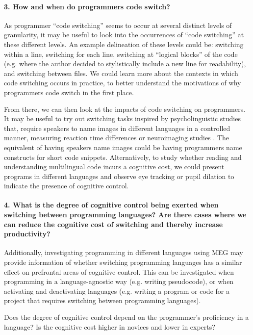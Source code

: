 \documentclass[a4paper,UKenglish,cleveref, autoref]{oasics-v2019}
\begin{document}
\paragraph*{3. How and when do programmers code switch?}

As programmer “code switching” seems to occur at several distinct levels of granularity, it may be useful to look into the occurrences of “code switching” at these different levels. An example delineation of these levels could be: switching within a line, switching for each line, switching at “logical blocks” of the code (e.g. where the author decided to stylistically include a new line for readability), and switching between files. We could learn more about the contexts in which code switching occurs in practice, to better understand the motivations of why programmers code switch in the first place. 

From there, we can then look at the impacts of code switching on programmers. It may be useful to try out switching tasks inspired by psycholinguistic studies that, require speakers to name images in different languages in a controlled manner, measuring reaction time differences or neuroimaging studies \cite{pl0048}. The equivalent of having speakers name images could be having programmers name constructs for short code snippets. Alternatively, to study whether reading and understanding multilingual code incurs a cognitive cost, we could present programs in different languages and observe eye tracking or pupil dilation to indicate the presence of cognitive control. 
\paragraph*{4. What is the degree of cognitive control being exerted when switching between programming languages? Are there cases where we can reduce the cognitive cost of switching and thereby increase productivity?}

Additionally, investigating programming in different languages using MEG may provide information of whether switching programming languages has a similar effect on prefrontal areas of cognitive control. This can be investigated when programming in a language-agnostic way (e.g. writing pseudocode), or when activating and deactivating languages (e.g. writing a program or code for a project that requires switching between programming languages). 

Does the degree of cognitive control depend on the programmer's proficiency in a language? Is the cognitive cost higher in novices and lower in experts? 
 
\end{document}
